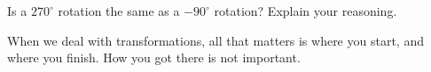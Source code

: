 \documentclass{ximera}
\author{Jenny Sheldon \and Bart Snapp}
\begin{document}
\begin{exercise}
   Is a $270^\circ$ rotation the same as a $-90^\circ$ rotation?
  Explain your reasoning.
  \begin{prompt}
    \begin{multipleChoice}
    \end{multipleChoice}
    \begin{feedback}[correct]
      When we deal with transformations, all that matters is where you
      start, and where you finish. How you got there is not important.
    \end{feedback}
  \end{prompt}
\end{exercise}
\end{document}
